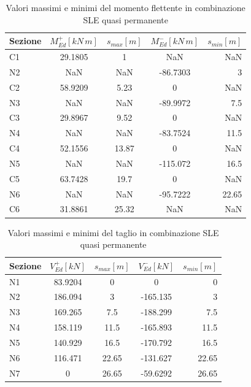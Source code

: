 \begin{table}[ht!]
	\centering
	\caption{Valori massimi e minimi del momento flettente in combinazione SLE quasi permanente}
	\label{tab:bendingMoment_sleQP}
    \begin{tabular*}{\textwidth}{l @{\extracolsep{\fill}} cccr}
\toprule
Sezione &  $M_{Ed}^+ [kN\,m]$ &  $s_{max} [m]$ &  $M_{Ed}^- [kN\,m]$ &  $s_{min} [m] $\\
\midrule
C1      &     29.1805 &        1 &         NaN &      NaN \\
N2      &         NaN &      NaN &    -86.7303 &        3 \\
C2      &     58.9209 &     5.23 &           0 &      NaN \\
N3      &         NaN &      NaN &    -89.9972 &      7.5 \\
C3      &     29.8967 &     9.52 &           0 &      NaN \\
N4      &         NaN &      NaN &    -83.7524 &     11.5 \\
C4      &     52.1556 &    13.87 &           0 &      NaN \\
N5      &         NaN &      NaN &    -115.072 &     16.5 \\
C5      &     63.7428 &     19.7 &           0 &      NaN \\
N6      &         NaN &      NaN &    -95.7222 &    22.65 \\
C6      &     31.8861 &    25.32 &         NaN &      NaN \\
\bottomrule
    \end{tabular*}
\end{table}

\begin{table}[ht!]
	\centering
	\caption{Valori massimi e minimi del taglio in combinazione SLE quasi permanente}
	\label{tab:shear_sleQP}
    \begin{tabular*}{\textwidth}{l @{\extracolsep{\fill}} cccr}
\toprule
Sezione &  $V_{Ed}^+ [kN]$ &  $s_{max} [m]$ &  $V_{Ed}^- [kN]$ &  $s_{min} [m] $\\
\midrule
N1      &   83.9204 &        0 &         0 &        0 \\
N2      &   186.094 &        3 &  -165.135 &        3 \\
N3      &   169.265 &      7.5 &  -188.299 &      7.5 \\
N4      &   158.119 &     11.5 &  -165.893 &     11.5 \\
N5      &   140.929 &     16.5 &  -170.792 &     16.5 \\
N6      &   116.471 &    22.65 &  -131.627 &    22.65 \\
N7      &         0 &    26.65 &  -59.6292 &    26.65 \\
\bottomrule
    \end{tabular*}
\end{table}




